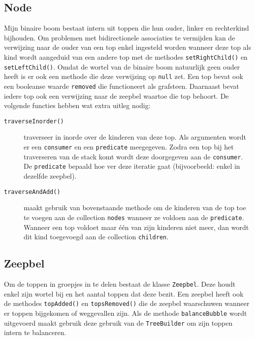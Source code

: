 \documentclass[12pt,hidelinks]{article}
\begin{document}
    \subsection{Node}
    Mijn binaire boom bestaat intern uit toppen die hun ouder,  linker en
    rechterkind bijhouden. Om problemen met bidirectionele associaties te vermijden kan de verwijzing
    naar de ouder van een top enkel ingesteld worden wanneer deze top als kind wordt
    aangeduid van een andere top met de methodes {\tt setRightChild()} en {\tt setLeftChild()}. Omdat de wortel van de binaire boom natuurlijk geen
    ouder heeft is er ook een methode die deze verwijzing op {\tt null} zet.
    Een top bevat ook een booleanse waarde {\tt removed} die functioneert als
    grafsteen. Daarnaast bevat iedere top ook een verwijzing naar de zeepbel waartoe die 
    top behoort. De volgende functies hebben wat extra uitleg nodig:\\
        \begin{description}
            \item[\tt traverseInorder()] traverseer in inorde over de kinderen van deze top. Als argumenten wordt er een {\tt consumer} en een {\tt predicate} meegegeven.
                Zodra een top bij het traverseren van de stack komt wordt deze doorgegeven aan de {\tt consumer}. De {\tt predicate} bepaald hoe ver deze iteratie gaat
                (bijvoorbeeld: enkel in dezelfde zeepbel).
            \item[\tt traverseAndAdd()] maakt gebruik van bovenstaande methode om de kinderen van de top toe te voegen aan de collection {\tt nodes} wanneer ze voldoen aan de
                {\tt predicate}. Wanneer een top voldoet maar één van zijn kinderen niet meer, dan wordt dit kind toegevoegd aan de collection {\tt children}.
        \end{description}
    \subsection{Zeepbel}
    Om de toppen in groepjes in te delen bestaat de klasse {\tt Zeepbel}. Deze houdt
    enkel zijn wortel bij en het aantal toppen dat deze bezit. Een zeepbel heeft ook de
    methodes {\tt topAdded()} en {\tt topsRemoved()} die de zeepbel waarschuwen wanneer
    er toppen bijgekomen of weggevallen zijn. Als de methode {\tt balanceBubble} wordt uitgevoerd
    maakt gebruik deze gebruik van de {\tt TreeBuilder} om zijn toppen intern te balanceren.
\end{document}
